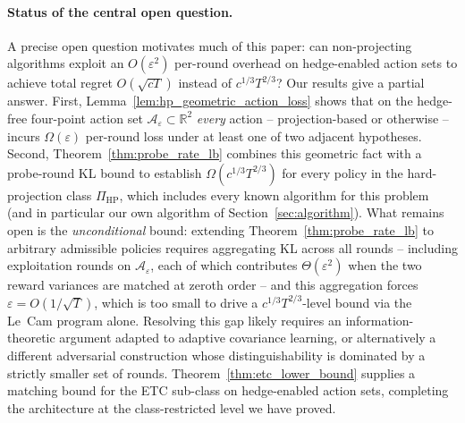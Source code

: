 \documentclass[11pt]{article}
\newcommand{\R}{\mathbb{R}}
\newcommand{\cA}{\mathcal{A}}
\begin{document}
\paragraph{Status of the central open question.}
A precise open question motivates much of this paper: can non-projecting
algorithms exploit an $O(\varepsilon^2)$ per-round overhead on
hedge-enabled action sets to achieve total regret $O(\sqrt{cT})$ instead
of $c^{1/3}T^{2/3}$?
Our results give a partial answer.  First,
Lemma~\ref{lem:hp_geometric_action_loss} shows that on the hedge-free
four-point action set $\cA_\varepsilon\subset\R^2$ \emph{every} action
-- projection-based or otherwise -- incurs $\Omega(\varepsilon)$
per-round loss under at least one of two adjacent hypotheses.
Second, Theorem~\ref{thm:probe_rate_lb} combines this geometric fact
with a probe-round KL bound to establish $\Omega(c^{1/3}T^{2/3})$ for
every policy in the hard-projection class $\Pi_{\mathrm{HP}}$, which
includes every known algorithm for this problem (and in particular our
own algorithm of Section~\ref{sec:algorithm}).
What remains open is the \emph{unconditional} bound: extending
Theorem~\ref{thm:probe_rate_lb} to arbitrary admissible policies
requires aggregating KL across all rounds -- including exploitation
rounds on $\cA_\varepsilon$, each of which contributes
$\Theta(\varepsilon^2)$ when the two reward variances are matched at
zeroth order -- and this aggregation forces $\varepsilon=O(1/\sqrt T)$,
which is too small to drive a $c^{1/3}T^{2/3}$-level bound via the
Le~Cam program alone.  Resolving this gap likely requires an
information-theoretic argument adapted to adaptive covariance learning,
or alternatively a different adversarial construction whose
distinguishability is dominated by a strictly smaller set of rounds.
Theorem~\ref{thm:etc_lower_bound} supplies a matching bound for the ETC
sub-class on hedge-enabled action sets, completing the architecture at
the class-restricted level we have proved.
\end{document}
